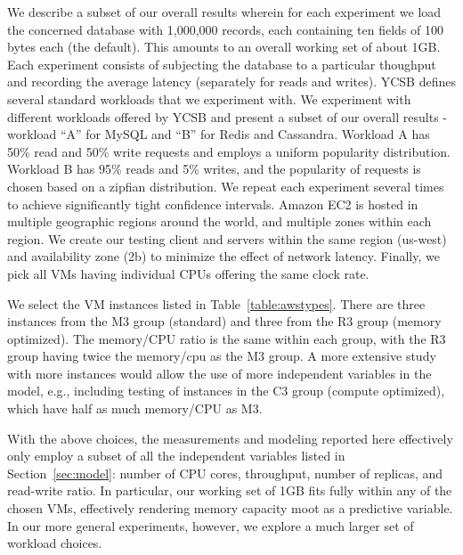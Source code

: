 


We describe a subset of our overall results wherein for each experiment %
we load the concerned database with 1,000,000 records, each containing ten fields of 100 bytes each (the default). This amounts to an overall working set of about 1GB. Each experiment consists of subjecting the database to a particular thoughput and recording the average latency (separately for reads and writes). YCSB defines several standard workloads that we experiment with. We experiment with different workloads offered by YCSB and present a subset of our overall results - workload ``A'' for MySQL and ``B'' for Redis and Cassandra. Workload A has 50\% read and 50\% write requests and employs a uniform popularity distribution. Workload B has 95\% reads and 5\% writes, and  the popularity of requests is chosen based on a zipfian distribution. We repeat each experiment several times to achieve significantly tight confidence intervals. 
Amazon EC2 is hosted in multiple geographic regions around the world, and multiple zones within each region.  We create our testing client and servers within the same region (us-west) and availability zone (2b) to minimize the effect of network latency. Finally, we pick all VMs having individual CPUs offering the same clock rate. 

We select the VM instances listed in Table~\ref{table:awstypes}.  
There are three instances from the M3 group (standard) and three from the R3 group (memory optimized).  The memory/CPU ratio is the same within each group, with the R3 group having twice the memory/cpu as the M3 group.  A more extensive study with more instances would allow the use of more independent variables in the model, e.g., including testing of instances in the C3 group (compute optimized), which have half as much memory/CPU as M3.

With the above choices, the measurements and modeling reported here effectively only employ a subset of all the independent variables listed in Section~\ref{sec:model}: number of CPU cores, throughput, number of replicas, and read-write ratio. In particular, our working set of 1GB fits fully within any of the chosen VMs, effectively rendering memory capacity moot as a predictive variable. In our more general experiments, however, we explore a much larger set of workload choices. 


